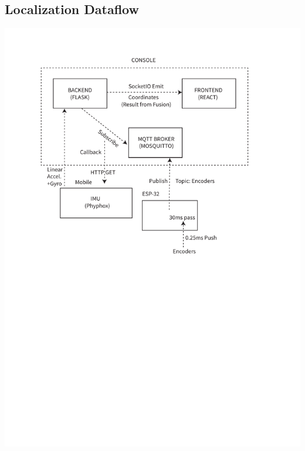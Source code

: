 \documentclass[a4paper,12pt]{article}
\begin{document}
\subsection{Localization Dataflow} \label{locflow}
\includegraphics[trim=40 380 0 57,scale=0.95,clip]{media/loc.pdf}
\end{document}
